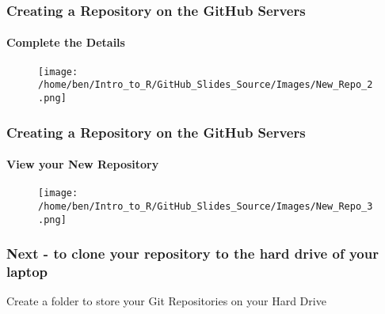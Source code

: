 \documentclass[xcolor=dvipsnames]{beamer}
\begin{document}
\begin{frame}
\frametitle{Creating a Repository on the GitHub Servers}
\framesubtitle{Complete the Details}
\begin{center}
\begin{figure}
\texttt{[image: /home/ben/Intro\_to\_R/GitHub\_Slides\_Source/Images/New\_Repo\_2.png]}
\end{figure}
\end{center}
\end{frame}

\begin{frame}
\frametitle{Creating a Repository on the GitHub Servers}
\framesubtitle{View your New Repository}
\begin{center}
\begin{figure}
\texttt{[image: /home/ben/Intro\_to\_R/GitHub\_Slides\_Source/Images/New\_Repo\_3.png]}
\end{figure}
\end{center}
\end{frame}

\begin{frame}
\frametitle{Next - to clone your repository to the hard drive of your laptop}
Create a folder to store your Git Repositories on your Hard Drive

\end{frame}
\end{document}
